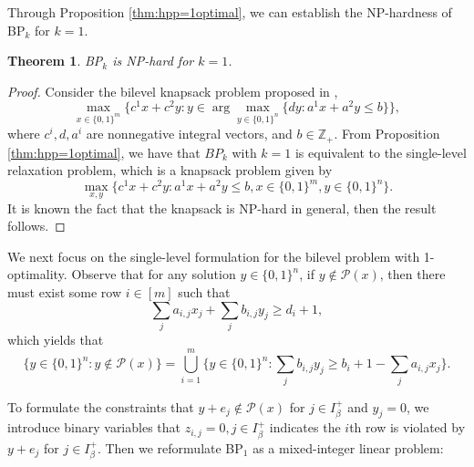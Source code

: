 \documentclass[11pt]{article}
\newtheorem{theorem}{Theorem}
\newcommand{\ZZ}{\mathbb{Z}}
\newcommand{\Pp}{\mathcal{P}}
\begin{document}
Through Proposition \ref{thm:hpp=1optimal}, we can establish the NP-hardness of BP$_k$ for $k=1$.
\begin{theorem}
	BP$_k$ is NP-hard for $k=1$.
\end{theorem}
\begin{proof}
	Consider the bilevel knapsack problem proposed in \cite{mansi2012exact}, 
	\[ \max_{x\in \{0,1\}^m}\Big\{c^1x + c^2y: y \in \arg\max_{y\in \{0,1\}^n}\{ dy: a^1x + a^2 y \leq b \} \Big\}, \]
	where $c^i, d, a^i$ are nonnegative integral vectors, and $b\in \ZZ_+$. From Proposition \ref{thm:hpp=1optimal}, we have that $BP_k$ with $k=1$ is equivalent to the single-level relaxation problem, which is a knapsack problem given by
	\[\max_{x, y}\Big\{c^1x + c^2y: a^1x + a^2 y \leq b, x\in \{0,1\}^m, y\in \{0,1\}^n \Big\}. \]
	It is known the fact that the knapsack is NP-hard in general, then the result follows.
\end{proof}


We next focus on the single-level formulation for the bilevel problem with 1-optimality. Observe that for any solution $y \in \{0,1\}^n$, if $y \notin \Pp(x)$, then there must exist some row $i\in [m]$ such that 
\[\sum_{j} a_{i,j} x_j + \sum_{j} b_{i,j} y_j \geq d_i + 1,  \]
which yields that
\[\Big\{y\in \{0,1\}^n: y\notin \Pp(x) \Big\} = \bigcup_{i=1}^m \Big\{y\in \{0,1\}^n: \sum_{j} b_{i,j} y_j \geq b_i + 1 -  \sum_{j} a_{i,j} x_j  \Big\}.\]

To formulate the constraints that $y+e_j \notin \Pp(x)$ for $j\in I_\beta^+$ and $y_j = 0$, we introduce binary variables that $z_{i,j} = 0, j \in I_\beta^+$ indicates the $i$th row is violated by $y+e_j$ for $j\in I_\beta^+$.  Then we reformulate BP$_1$ as a mixed-integer linear problem:
\end{document}

